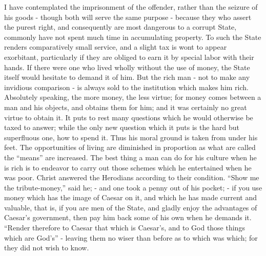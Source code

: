 \documentclass[letterpaper,12pt,english]{sphinxmanual}
\begin{document}
I have contemplated the imprisonment of the offender, rather than the seizure of his goods - though both will serve the same purpose - because they who assert the purest right, and consequently are most dangerous to a corrupt State, commonly have not spent much time in accumulating property. To such the State renders comparatively small service, and a slight tax is wont to appear exorbitant, particularly if they are obliged to earn it by special labor with their hands. If there were one who lived wholly without the use of money, the State itself would hesitate to demand it of him. But the rich man - not to make any invidious comparison - is always sold to the institution which makes him rich. Absolutely speaking, the more money, the less virtue; for money comes between a man and his objects, and obtains them for him; and it was certainly no great virtue to obtain it. It puts to rest many questions which he would otherwise be taxed to answer; while the only new question which it puts is the hard but superfluous one, how to spend it. Thus his moral ground is taken from under his feet. The opportunities of living are diminished in proportion as what are called the ``means'' are increased. The best thing a man can do for his culture when he is rich is to endeavor to carry out those schemes which he entertained when he was poor. Christ answered the Herodians according to their condition. ``Show me the tribute-money,'' said he; - and one took a penny out of his pocket; - if you use money which has the image of Caesar on it, and which he has made current and valuable, that is, if you are men of the State, and gladly enjoy the advantages of Caesar's government, then pay him back some of his own when he demands it. ``Render therefore to Caesar that which is Caesar's, and to God those things which are God's'' - leaving them no wiser than before as to which was which; for they did not wish to know.
\end{document}
